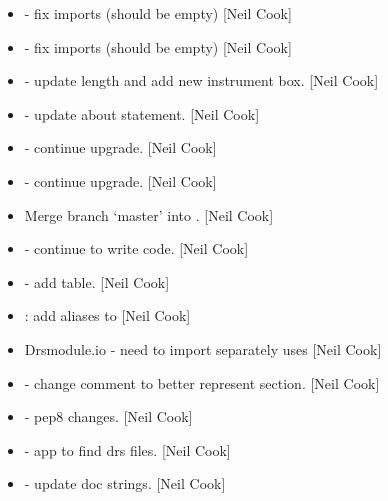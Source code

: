 \documentclass[a4paper,10pt,english]{report}
\begin{document}
\begin{itemize}
\item {} 
 - fix imports (should be empty) {[}Neil Cook{]}

\item {} 
 - fix imports (should be empty) {[}Neil Cook{]}

\item {} 
 - update length and add new instrument box. {[}Neil
Cook{]}

\item {} 
 - update about statement. {[}Neil Cook{]}

\item {} 
 - continue upgrade. {[}Neil Cook{]}

\item {} 
 - continue upgrade. {[}Neil Cook{]}

\item {} 
Merge branch ‘master’ into . {[}Neil Cook{]}

\item {} 
 - continue to write code. {[}Neil Cook{]}

\item {} 
 - add table. {[}Neil Cook{]}

\item {} 
: add aliases to  {[}Neil Cook{]}

\item {} 
Drsmodule.io - need to import  separately  uses
 {[}Neil Cook{]}

\item {} 
 - change comment to better represent section. {[}Neil Cook{]}

\item {} 
 - pep8 changes. {[}Neil Cook{]}

\item {} 
 - app to find drs files. {[}Neil Cook{]}

\item {} 
 - update doc strings. {[}Neil Cook{]}


\end{itemize}
\end{document}

